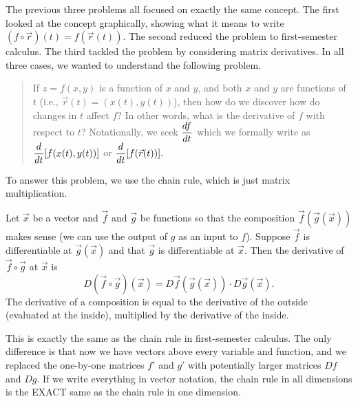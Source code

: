 The previous three problems all focused on exactly the same concept.  The first looked at the concept graphically, showing  what it means to write $(f\circ \vec r)(t)=f(\vec r(t))$. The second reduced the problem to first-semester calculus. The third tackled the problem by considering matrix derivatives.  In all three cases, we wanted to understand the following problem.
\begin{quote}
 If $z=f(x,y)$ is a function of $x$ and $y$, and both $x$ and $y$ are functions of $t$ (i.e., $\vec r(t)=(x(t),y(t))$), then how do we discover how do changes in $t$ affect $f$?  In other words, what is the derivative of $f$ with respect to $t$? Notationally, we seek $\displaystyle \frac{df}{dt}$ which we formally write as $\displaystyle \frac{d}{dt}[f(x(t),y(t))]$ or $\displaystyle \frac{d}{dt} [f(\vec r(t))].$
\end{quote}
To answer this problem, we use the chain rule, which is just matrix multiplication.
\begin{theorem}\label{chain rule def}
 Let $\vec x$ be a vector and $\vec f$ and $\vec g$ be functions so that the composition $\vec f(\vec g(\vec x))$ makes sense (we can use the output of $g$ as an input to $f$). Suppose $\vec f$ is differentiable at $\vec g(\vec x)$ and that $\vec g$ is differentiable at $\vec x$. Then the derivative of $\vec f\circ \vec g$ at $\vec x$ is 
$$D(\vec f\circ \vec g)(\vec x) = D\vec f(\vec g(\vec x))\cdot D\vec g(\vec x).$$
 The derivative of a composition is equal to the derivative of the outside (evaluated at the inside), multiplied by the derivative of the inside.  
\end{theorem}
This is exactly the same as the chain rule in first-semester calculus.  The only difference is that now we have vectors above every variable and function, and we replaced the one-by-one matrices $f'$ and $g'$ with potentially larger matrices $Df$ and $Dg$. If we write everything in vector notation, the chain rule in all dimensions is the EXACT same as the chain rule in one dimension.


